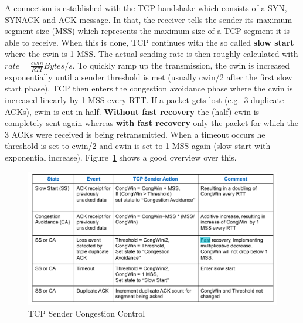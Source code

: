 A connection is established with the TCP handshake which consists of a SYN, SYNACK and ACK message.
In that, the receiver tells the sender its maximum segment size (MSS) which represents the maximum size of a TCP segment it is able to receive.
When this is done, TCP continues with the so called \textbf{slow start} where the cwin is 1 MSS\@.
The actual sending rate is then roughly calculated with $rate = \frac{cwin}{RTT} Bytes/s$.
To quickly ramp up the transmission, the cwin is increased exponentially until a sender threshold is met (usually cwin/2 after the first slow start phase).
TCP then enters the congestion avoidance phase where the cwin is increased linearly by 1 MSS every RTT\@.
If a packet gets lost (e.g.\ 3 duplicate ACKs), cwin is cut in half.
\textbf{Without fast recovery} the (half) cwin is completely sent again whereas \textbf{with fast recovery} only the packet for which the 3 ACKs were received is being retransmitted.
When a timeout occurs he threshold is set to cwin/2 and cwin is set to 1 MSS again (slow start with exponential increase).
Figure~\ref{fig:tcp_sender_congestion_control} shows a good overview over this.\\
\begin{figure}[h]
  \centering
  \includegraphics[width=.8\textwidth]{figures/tcp_sender_congestion_control}
  \caption{TCP Sender Congestion Control}\label{fig:tcp_sender_congestion_control}
\end{figure}

